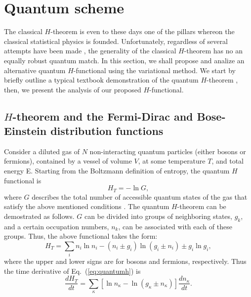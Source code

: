 \section{Quantum scheme}\label{sec:quantum}

The classical $H$-theorem is even to these days one of the pillars whereon the classical statistical
physics is founded. Unfortunately, regardless of several attempts have been made
, 
the generality of the classical $H$-theorem has no an equally robust quantum match. In this section, we shall
propose and analize an alternative quantum $H$-functional using the variational method.
We start by briefly outline a typical textbook demonstration of the quantum $H$-theorem
\cite{bib:tolman}, then, we present the analysis of our proposed $H$-functional.

\subsection{$H$-theorem and the Fermi-Dirac and Bose-Einstein distribution functions}

Consider a diluted gas of $N$ non-interacting quantum particles (either bosons or fermions),
contained by a vessel of volume
$V$, at some temperature $T$, and total energy E. Starting from the Boltzmann definition
of entropy, the quantum $H$ functional is
%
\begin{equation}
   H_T=-\ln G,
\end{equation}
%
where $G$ describes the total number of accessible quantum states of the gas that satisfy the
above mentioned conditions \cite{bib:tolman}.
The quantum $H$-theorem can be demostrated as follows.  $G$ can be divided into groups of neighboring states,
$g_k$, and a certain occupation numbers, $n_k$, can be associated with each of these
groups. Thus, the above functional takes the form:
%
\begin{equation}\label{eq:quantumh}
    H_T=\sum_i n_i \ln n_i -(n_i\pm g_i)\ln (g_i \pm n_i)\pm g_i\ln g_i, 
\end{equation}
%
where the upper and lower signs are for bosons and fermions, respectively.
Thus the time derivative of Eq.~(\ref{eq:quantumh}) is
%
\begin{equation}\label{eq:quantumdHdt}
\frac{dH_T}{dt}=\sum_{\kappa}\left[\ln n_{\kappa}-\ln\left(g_{\kappa}\pm n_{\kappa}\right)\right]
\frac{dn_{\kappa}}{dt}.
\end{equation}
%

